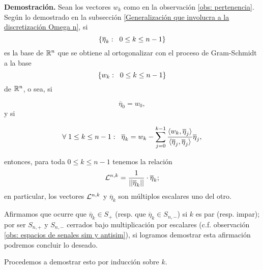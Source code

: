 \noindent
\textbf{Demostración.}
Sean los vectores $w_{k}$ como en la observación 
\ref{obs: pertenencia}.
Según lo demostrado en la subsección 
\ref{Generalización que involucra a la discretización Omega n}, si
\[
\{ \overline{\eta}_{k} : \hspace{0.2cm} 0 \leq k \leq n-1 \}
\]
es la base de $\mathbb{R}^{n}$ que se obtiene al ortogonalizar 
con el proceso de Gram-Schmidt a la base
\[
\{ w_{k} : \hspace{0.2cm} 0 \leq k \leq n-1 \}
\]
de $\mathbb{R}^{n}$,
o sea, si 

\begin{equation}
\label{eq3: 19En}
\overline{\eta}_{0}= w_{0},
\end{equation}
y si

\begin{equation}
\label{eq4: 19En}
\forall \hspace{0.1cm} 1 \leq k \leq n-1: 
\hspace{0.2cm}
\overline{\eta}_{k}= w_{k}-
\suma{j=0}{k-1}{
\frac{\langle w_{k}, \overline{\eta}_{j} \rangle}
{\langle \overline{\eta}_{j}, \overline{\eta}_{j} \rangle}\overline{\eta}_{j},
}
\end{equation}


\noindent
entonces, para toda $0 \leq k \leq n-1$ tenemos la relación 
\[
\mathcal{L}^{n,k}= \frac{1}{||\overline{\eta}_{k}||} \cdot \overline{\eta}_{k};
\]
en particular, los vectores $\mathcal{L}^{n,k}$ y 
$\overline{\eta}_{k}$ son múltiplos escalares uno del otro.

Afirmamos que ocurre que
$\overline{\eta}_{k} \in S_{+}$ (resp. que
$\overline{\eta}_{k} \in S_{n,-}$) si $k$ es par
(resp. impar); por ser $S_{n,+}$
y $S_{n,-}$ cerrados bajo multiplicación
por escalares (c.f. observación 
\ref{obs: espacios de senales sim y antisim}),
si logramos demostrar esta afirmación podremos concluir lo deseado.



Procedemos a demostrar esto por inducción sobre $k$.

